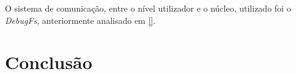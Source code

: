 O sistema de comunicação, entre o nível utilizador e o núcleo, utilizado foi o \textit{DebugFs}, anteriormente analisado em \ref{}.












\section{Conclusão}
\label{sec:implement_conclusion}

